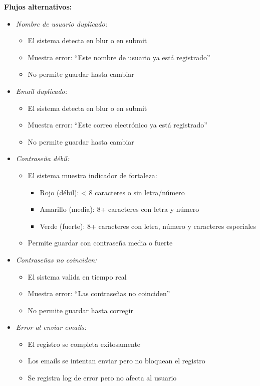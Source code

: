 \vspace{0.5em}
\noindent\textbf{Flujos alternativos:}
\begin{itemize}[nosep]
    \item \textit{Nombre de usuario duplicado:}
    \begin{itemize}[nosep]
        \item El sistema detecta en blur o en submit
        \item Muestra error: ``Este nombre de usuario ya está registrado''
        \item No permite guardar hasta cambiar
    \end{itemize}
    \item \textit{Email duplicado:}
    \begin{itemize}[nosep]
        \item El sistema detecta en blur o en submit
        \item Muestra error: ``Este correo electrónico ya está registrado''
        \item No permite guardar hasta cambiar
    \end{itemize}
    \item \textit{Contraseña débil:}
    \begin{itemize}[nosep]
        \item El sistema muestra indicador de fortaleza:
        \begin{itemize}[nosep]
            \item Rojo (débil): < 8 caracteres o sin letra/número
            \item Amarillo (media): 8+ caracteres con letra y número
            \item Verde (fuerte): 8+ caracteres con letra, número y caracteres especiales
        \end{itemize}
        \item Permite guardar con contraseña media o fuerte
    \end{itemize}
    \item \textit{Contraseñas no coinciden:}
    \begin{itemize}[nosep]
        \item El sistema valida en tiempo real
        \item Muestra error: ``Las contraseñas no coinciden''
        \item No permite guardar hasta corregir
    \end{itemize}
    \item \textit{Error al enviar emails:}
    \begin{itemize}[nosep]
        \item El registro se completa exitosamente
        \item Los emails se intentan enviar pero no bloquean el registro
        \item Se registra log de error pero no afecta al usuario
    \end{itemize}
\end{itemize}

